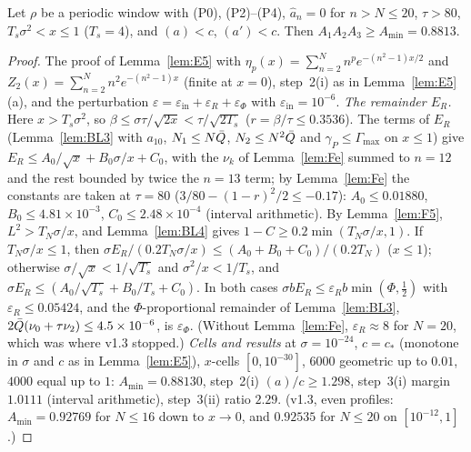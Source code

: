 \begin{lemma} 
\label{lem:F6}
Let $\rho$ be a periodic window with (P0), (P2)--(P4), $\hat a_n=0$ for $n>N\le20$, $\tau>80$, $T_s\sigma^2<x\le1$ ($T_s=4$), and $(a)<c$, $(a')<c$. Then
$A_1A_2A_3\ge A_{\min}=0.8813$.
\end{lemma}
\begin{proof}
The proof of Lemma~\ref{lem:E5} with $\eta_p(x)=\sum_{n=2}^Nn^pe^{-(n^2-1)x/2}$ and $Z_2(x)=\sum_{n=2}^Nn^2e^{-(n^2-1)x}$ (finite at $x=0$), step~2(i) as in
Lemma~\ref{lem:E5}(a), and the perturbation $\varepsilon=\varepsilon_{\mathrm{in}}+\varepsilon_R+\varepsilon_\Phi$ with $\varepsilon_{\mathrm{in}}=10^{-6}$.
\emph{The remainder $E_R$.} Here $x>T_s\sigma^2$, so $\beta\le\sigma\tau/\sqrt{2x}<\tau/\sqrt{2T_s}$ ($r=\beta/\tau\le0.3536$). The terms of $E_R$
(Lemma~\ref{lem:BL3} with $a_{10}$, $N_1\le N\bar Q$, $N_2\le N^2\bar Q$ and $\gamma_P\le\Gamma_{\max}$ on $x\le1$) give $E_R\le A_0/\sqrt x+B_0\sigma/x+C_0$, with the $\nu_k$ of
Lemma~\ref{lem:Fe} summed to $n=12$ and the rest bounded by twice the $n=13$ term; by Lemma~\ref{lem:Fe} the constants are taken at $\tau=80$
($3/80-(1-r)^2/2\le-0.17$): $A_0\le0.01880$, $B_0\le4.81\times10^{-3}$, $C_0\le2.48\times10^{-4}$ (interval arithmetic). By Lemma~\ref{lem:F5}, $L^2>T_N\sigma/x$, and
Lemma~\ref{lem:BL4} gives $1-C\ge0.2\min(T_N\sigma/x,1)$. If $T_N\sigma/x\le1$, then $\sigma E_R/(0.2T_N\sigma/x)\le(A_0+B_0+C_0)/(0.2T_N)$ ($x\le1$); otherwise
$\sigma/\sqrt x<1/\sqrt{T_s}$ and $\sigma^2/x<1/T_s$, and $\sigma E_R\le(A_0/\sqrt{T_s}+B_0/T_s+C_0)$. In both cases $\sigma bE_R\le\varepsilon_Rb\min(\Phi,\frac12)$ with
$\varepsilon_R\le0.05424$, and the $\Phi$-proportional remainder of Lemma~\ref{lem:BL3}, $2\bar Q(\nu_0+\tau\nu_2)\le4.5\times10^{-6}$, is $\varepsilon_\Phi$. (Without Lemma~\ref{lem:Fe},
$\varepsilon_R\approx8$ for $N=20$, which was where v1.3 stopped.)
\emph{Cells and results} at $\sigma=10^{-24}$, $c=c_*$ (monotone in $\sigma$ and $c$ as in Lemma~\ref{lem:E5}), $x$-cells $[0,10^{-30}]$, $6000$ geometric up to $0.01$,
$4000$ equal up to $1$: $A_{\min}=0.88130$, step~2(i) $(a)/c\ge1.298$, step~3(i) margin $1.0111$ (interval arithmetic), step~3(ii) ratio $2.29$.
(v1.3, even profiles: $A_{\min}=0.92769$ for $N\le16$ down to $x\to0$, and $0.92535$ for $N\le20$ on $[10^{-12},1]$.)
\end{proof}

